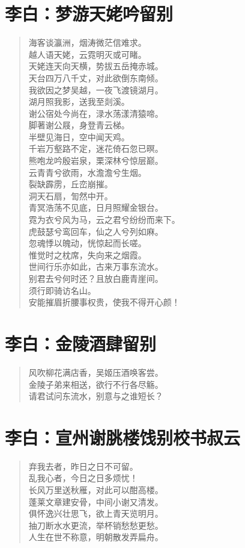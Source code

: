 \documentclass[12pt,oneside]{book}
\newenvironment{shici}{
\begin{verse}
\centering\large\hspace{12pt}}
{\end{verse}}
\begin{document}
\chapter{李白：梦游天姥吟留别}
\begin{shici}
海客谈瀛洲，烟涛微茫信难求。\\
越人语天姥，云霓明灭或可睹。\\
天姥连天向天横，势拔五岳掩赤城。\\
天台四万八千丈，对此欲倒东南倾。\\
我欲因之梦吴越，一夜飞渡镜湖月。\\
湖月照我影，送我至剡溪。\\
谢公宿处今尚在，渌水荡漾清猿啼。\\
脚著谢公屐，身登青云梯。\\
半壁见海日，空中闻天鸡。\\
千岩万壑路不定，迷花倚石忽已暝。\\
熊咆龙吟殷岩泉，栗深林兮惊层巅。\\
云青青兮欲雨，水澹澹兮生烟。\\
裂缺霹雳，丘峦崩摧。\\
洞天石扇，訇然中开。\\
青冥浩荡不见底，日月照耀金银台。\\
霓为衣兮风为马，云之君兮纷纷而来下。\\
虎鼓瑟兮鸾回车，仙之人兮列如麻。\\
忽魂悸以魄动，恍惊起而长嗟。\\
惟觉时之枕席，失向来之烟霞。\\
世间行乐亦如此，古来万事东流水。\\
别君去兮何时还？且放白鹿青崖间。\\
须行即骑访名山。\\
安能摧眉折腰事权贵，使我不得开心颜！
\end{shici}

\chapter{李白：金陵酒肆留别}
\begin{shici}
风吹柳花满店香，吴姬压酒唤客尝。\\
金陵子弟来相送，欲行不行各尽觞。\\
请君试问东流水，别意与之谁短长？
\end{shici}

\chapter{李白：宣州谢朓楼饯别校书叔云}
\begin{shici}
弃我去者，昨日之日不可留。\\
乱我心者，今日之日多烦忧！\\
长风万里送秋雁，对此可以酣高楼。\\
蓬莱文章建安骨，中间小谢又清发。\\
俱怀逸兴壮思飞，欲上青天览明月。\\
抽刀断水水更流，举杯销愁愁更愁。\\
人生在世不称意，明朝散发弄扁舟。
\end{shici}
\end{document}
